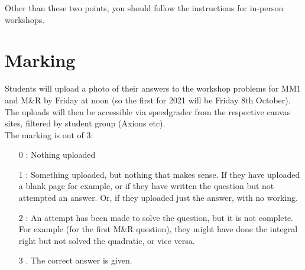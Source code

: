 \documentclass[11.5pt,sans,english]{article}
\begin{document}
Other than these two points, you should follow the instructions for in-person workshops.

\section{Marking}

Students will upload a photo of their answers to the workshop problems for MM1 and M\&R by Friday at noon (so the first for 2021 will be Friday 8th October).\\

The uploads will then be accessible via speedgrader from the respective canvas sites, filtered by student group (Axions etc).\\

The marking is out of 3:\\
\begin{itemize}
\item[0]: Nothing uploaded
\item[1]: Something uploaded, but nothing that makes sense. If they have uploaded a blank page for example, or if they have written the question but not attempted an answer. Or, if they uploaded just the answer, with no working.
\item[2]: An attempt has been made to solve the question, but it is not complete. For example (for the first M\&R question), they might have done the integral right but not solved the quadratic, or vice versa.
\item[3]. The correct answer is given.
\end{itemize}
\end{document}
